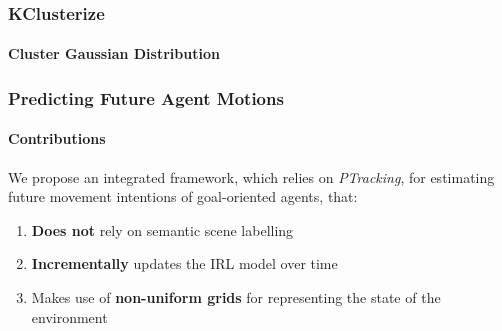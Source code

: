 \begin{frame}
	\frametitle{KClusterize}
	\framesubtitle{Cluster Gaussian Distribution}
	
	\setcounter{subfigure}{0}
	
	\begin{figure}[!t]
		\centering
		\hspace{-3.8mm}
	\end{figure}
\end{frame}

\begin{frame}
	\frametitle{Predicting Future Agent Motions}
	\framesubtitle{Contributions}
	
	\Large
	
	\vspace{0.4cm}
	
	We propose an integrated framework, which relies on \emph{PTracking}, for estimating future movement
	intentions of goal-oriented agents, that:
	
	\vspace{0.15cm}
	
	\begin{enumerate}
		\item \textbf{Does not} rely on semantic scene labelling
		\item \textbf{Incrementally} updates the IRL model over time
		\item Makes use of \textbf{non-uniform grids} for representing the state of the environment
	\end{enumerate}
\end{frame}

